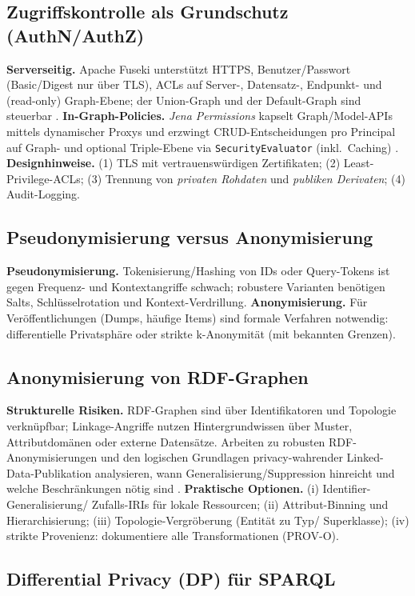 \subsection{Zugriffskontrolle als Grundschutz (AuthN/AuthZ)}
\textbf{Serverseitig.} Apache Fuseki unterstützt HTTPS, Benutzer/Passwort (Basic/Digest nur über TLS), ACLs auf Server-, Datensatz-, Endpunkt- und (read-only) Graph-Ebene; der Union-Graph und der Default-Graph sind steuerbar \cite{FusekiAccess}. \textbf{In-Graph-Policies.} \emph{Jena Permissions} kapselt Graph/Model-APIs mittels dynamischer Proxys und erzwingt CRUD-Entscheidungen pro Principal auf Graph- und optional Triple-Ebene via \texttt{SecurityEvaluator} (inkl.\ Caching) \cite{JenaPermissions}. 
\textbf{Designhinweise.} (1) TLS mit vertrauenswürdigen Zertifikaten; (2) Least-Privilege-ACLs; (3) Trennung von \emph{privaten Rohdaten} und \emph{publiken Derivaten}; (4) Audit-Logging.

\subsection{Pseudonymisierung versus Anonymisierung}
\textbf{Pseudonymisierung.} Tokenisierung/Hashing von IDs oder Query-Tokens ist gegen Frequenz- und Kontextangriffe schwach; robustere Varianten benötigen Salts, Schlüsselrotation und Kontext-Verdrillung. \textbf{Anonymisierung.} Für Veröffentlichungen (Dumps, häufige Items) sind formale Verfahren notwendig: differentielle Privatsphäre oder strikte k-Anonymität (mit bekannten Grenzen).

\subsection{Anonymisierung von RDF-Graphen}
\textbf{Strukturelle Risiken.} RDF-Graphen sind über Identifikatoren und Topologie verknüpfbar; Linkage-Angriffe nutzen Hintergrundwissen über Muster, Attributdomänen oder externe Datensätze. Arbeiten zu robusten RDF-Anonymisierungen und den logischen Grundlagen privacy-wahrender Linked-Data-Publikation analysieren, wann Generalisierung/Suppression hinreicht und welche Beschränkungen nötig sind \cite{delanaux-linkage, logical-foundations-lda}. 
\textbf{Praktische Optionen.} (i) Identifier-Generalisierung/ Zufalls-IRIs für lokale Ressourcen; (ii) Attribut-Binning und Hierarchisierung; (iii) Topologie-Vergröberung (Entität zu Typ/ Superklasse); (iv) strikte Provenienz: dokumentiere alle Transformationen (PROV-O).

\subsection{Differential Privacy (DP) für SPARQL}
